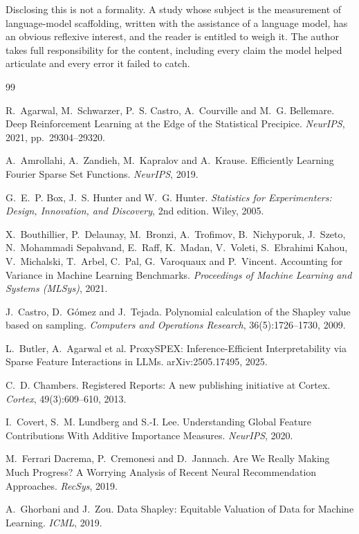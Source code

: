 \documentclass[11pt]{article}
\theoremstyle{plain}
\theoremstyle{definition}
\theoremstyle{remark}
\begin{document}
Disclosing this is not a formality. A study whose subject is the measurement of language-model scaffolding, written with the assistance of a language model, has an obvious reflexive interest, and the reader is entitled to weigh it. The author takes full responsibility for the content, including every claim the model helped articulate and every error it failed to catch.

\begin{thebibliography}{99}

 R.~Agarwal, M.~Schwarzer, P.~S. Castro, A.~Courville and M.~G. Bellemare. Deep Reinforcement Learning at the Edge of the Statistical Precipice. \emph{NeurIPS}, 2021, pp.~29304--29320.

 A.~Amrollahi, A.~Zandieh, M.~Kapralov and A.~Krause. Efficiently Learning Fourier Sparse Set Functions. \emph{NeurIPS}, 2019.

 G.~E.~P. Box, J.~S. Hunter and W.~G. Hunter. \emph{Statistics for Experimenters: Design, Innovation, and Discovery}, 2nd edition. Wiley, 2005.

 X.~Bouthillier, P.~Delaunay, M.~Bronzi, A.~Trofimov, B.~Nichyporuk, J.~Szeto, N.~Mohammadi Sepahvand, E.~Raff, K.~Madan, V.~Voleti, S.~Ebrahimi Kahou, V.~Michalski, T.~Arbel, C.~Pal, G.~Varoquaux and P.~Vincent. Accounting for Variance in Machine Learning Benchmarks. \emph{Proceedings of Machine Learning and Systems (MLSys)}, 2021.

 J.~Castro, D.~G\'omez and J.~Tejada. Polynomial calculation of the Shapley value based on sampling. \emph{Computers and Operations Research}, 36(5):1726--1730, 2009.

 L.~Butler, A.~Agarwal et al. ProxySPEX: Inference-Efficient Interpretability via Sparse Feature Interactions in LLMs. arXiv:2505.17495, 2025.

 C.~D. Chambers. Registered Reports: A new publishing initiative at Cortex. \emph{Cortex}, 49(3):609--610, 2013.

 I.~Covert, S.~M. Lundberg and S.-I. Lee. Understanding Global Feature Contributions With Additive Importance Measures. \emph{NeurIPS}, 2020.

 M.~Ferrari Dacrema, P.~Cremonesi and D.~Jannach. Are We Really Making Much Progress? A Worrying Analysis of Recent Neural Recommendation Approaches. \emph{RecSys}, 2019.

 A.~Ghorbani and J.~Zou. Data Shapley: Equitable Valuation of Data for Machine Learning. \emph{ICML}, 2019.


\end{thebibliography}
\end{document}
